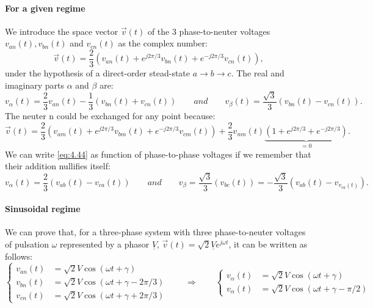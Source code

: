 		\paragraph{For a given regime}\quad We introduce the space vector $\vec{v}(t)$ of the 3 phase-to-neuter voltages $v_{an}(t), v_{bn}(t)$ and $v_{cn}(t)$ as the complex number: 
		\begin{equation}
			\vec{v}(t) = \frac{2}{3} \left( v_{an}(t) + e^{j2\pi/3}v_{bn}(t)+ e^{-j2\pi/3}v_{cn}(t) \right),
		\end{equation}
	    under the hypothesis of a direct-order stead-state $a\rightarrow b \rightarrow c$. The real and imaginary parts $\alpha$ and $\beta$ are:
		\begin{equation}
			v_{\alpha}(t) = \frac{2}{3} v_{an}(t) - \frac{1}{3}(v_{bn}(t) + v_{cn}(t)) \qquad and \qquad v_{\beta}(t) = \frac{\sqrt{3}}{3}(v_{bn}(t) - v_{cn}(t)).
			\label{eq:4.44}
		\end{equation}
		The neuter n could be exchanged for any point because:
		\begin{equation}
			\vec{v}(t) = \frac{2}{3} \left( v_{am}(t) + e^{j2\pi/3}v_{bm}(t)+ e^{-j2\pi/3}v_{cm}(t) \right) + \frac{2}{3}v_{nm}(t) \underbrace{\left( 1+e^{j2\pi/3} + e^{-j2\pi/3}\right)}_{=0}. 
		\end{equation}
		We can write \eqref{eq:4.44} as function of phase-to-phase voltages if we remember that their addition nullifies itself: 
		\begin{equation}
			v_\alpha (t) = \frac{2}{3}(v_{ab}(t) - v_{ca}(t)) \qquad and \qquad v_\beta = \frac{\sqrt{3}}{3}(v_{bc}(t))= -\frac{\sqrt{3}}{3}(v_{ab}(t)-v_{v_{ca}(t)}).
		\end{equation}
		
		\paragraph{Sinusoidal regime} \quad We can prove that, for a three-phase system with three phase-to-neuter voltages of pulsation $\omega$ represented by a phasor $\underline{V}$, $\vec{v}(t) = \sqrt{2}\underline{V}e^{j\omega t}$, it can be written as follows:
		\begin{equation}
			\left\{
			\begin{aligned}
			v_{an}(t) &= \sqrt{2}V \cos (\omega t +\gamma)\\
			v_{bn}(t) &= \sqrt{2}V \cos (\omega t +\gamma - 2\pi /3)\\
			v_{cn}(t) &= \sqrt{2}V \cos (\omega t +\gamma + 2\pi /3)
			\end{aligned}
			\right.
			\qquad \Rightarrow \qquad
			\left\{ 
			\begin{aligned}
			v_\alpha (t) &= \sqrt{2}V\cos (\omega t + \gamma)\\
			v_\alpha (t) &= \sqrt{2}V\cos (\omega t + \gamma - \pi /2)
			\end{aligned}
			\right.
		\end{equation}
		
